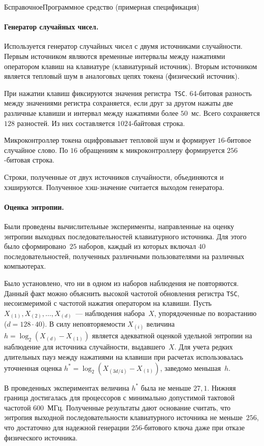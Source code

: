 \begin{appendix}{Б}{справочное}{Программное средство \CryptoDisk 
(примерная спецификация)}
\label{EXAMPLE.RNG}

\paragraph*{Генератор случайных чисел.}
Используется генератор случайных чисел с двумя источниками случайности.
Первым источником являются временные интервалы между нажатиями 
оператором клавиш на клавиатуре (клавиатурный источник).
%
Вторым источником является тепловый шум в аналоговых цепях токена (физический источник).

При нажатии клавиш фиксируются значения регистра~\texttt{TSC}. 64-битовая
разность между значениями регистра сохраняется, если друг за другом нажаты
две различные клавиши и интервал между нажатиями более $50$~мс. Всего
сохраняется $128$ разностей. Из них составляется $1024$-байтовая строка.

Микроконтроллер токена оцифровывает тепловой шум и формирует $16$-битовое 
случайное слово. По $16$ обращениям к микроконтроллеру формируется $256$-битовая строка.

Строки, полученные от двух источников случайности, объединяются и хэшируются.
Полученное хэш-значение считается выходом генератора.

\paragraph*{Оценка энтропии.}
Были проведены вычислительные эксперименты,
направленные на оценку энтропии выходных последовательностей
клавиатурного источника.
Для этого было сформировано~$25$ наборов, 
каждый из которых включал $40$ последовательностей,
полученных различными пользователями на различных компьютерах. 

Было установлено, что ни в одном из наборов наблюдения не повторяются.
Данный факт можно объяснить высокой частотой обновления регистра \texttt{TSC},
несоизмеримой с частотой нажатия оператором на клавиши.
%
Пусть $X_{(1)},X_{(2)},\ldots,X_{(d)}$~--- наблюдения набора~$X$, 
упорядоченные по возрастанию ($d=128\cdot 40$). 
%
В силу неповторяемости $X_{(i)}$
величина~$h=\log_2(X_{(d)}-X_{(1)})$
является адекватной оценкой удельной энтропии на наблюдение для источника
случайности, выдавшего~$X$.
%
Для учета редких длительных пауз между нажатиями на клавиши
при расчетах использовалась уточненная оценка $h^*=\log_2(X_{(3d/4)}-X_{(1)})$,
заведомо меньшая~$h$.

В проведенных экспериментах величина $h^*$ была не меньше $27,1$.
%
Нижняя граница достигалась для процессоров 
с минимально допустимой тактовой частотой $600$~МГц.
%
Полученные результаты дают основание считать, что энтропия выходной
последовательности клавиатурного источника не меньше~$256$,
что достаточно для надежной генерации $256$-битового ключа даже при отказе
физического источника.


\end{appendix}
